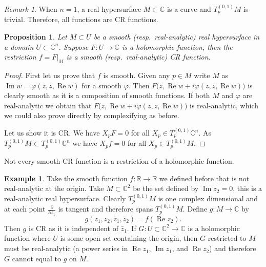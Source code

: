 \documentclass[12pt,openany]{book}
\renewcommand{\Re}{\operatorname{Re}}
\renewcommand{\Im}{\operatorname{Im}}
\newcommand{\C}{{\mathbb{C}}}
\newcommand{\R}{{\mathbb{R}}}
\theoremstyle{plain}
\newtheorem{prop}[thm]{Proposition}
\theoremstyle{remark}
\newtheorem{remark}[thm]{Remark}
\theoremstyle{definition}
\theoremstyle{exercise}
\theoremstyle{example}
\newtheorem{example}[thm]{Example}
\begin{document}
\begin{remark}
When $n=1$, a real hypersurface $M \subset \C$ is a curve and $T^{(0,1)}_p M$
is trivial.  Therefore, all functions are CR functions.
\end{remark}

\begin{prop}
Let $M \subset U$ be a smooth (resp.\ real-analytic) real hypersurface in a domain $U
\subset \C^n$.  Suppose $F \colon U \to \C$ is a holomorphic function,
then the restriction $f = F|_M$ is a smooth (resp.\ real-analytic) CR function.
\end{prop}

\begin{proof}
First let us prove that $f$ is smooth.  Given any $p \in M$ write $M$
as $\Im w = \varphi(z,\bar{z},\Re w)$ for a smooth $\varphi$.
Then $F\bigl(z,\Re w + i \varphi(z,\bar{z},\Re w) \bigr)$
is clearly smooth as it is a composition of smooth functions.
If both $M$ and $\varphi$ are real-analytic we obtain that 
$F\bigl(z,\Re w + i \varphi(z,\bar{z},\Re w) \bigr)$ is real-analytic, which
we could also prove directly by complexifying as before.

Let us show it is CR.
We have $X_p F = 0$
for all $X_p \in T_p^{(0,1)} \C^n$.
As $T_p^{(0,1)} M \subset T_p^{(0,1)} \C^n$ we have
$X_p f = 0$ for all $X_p \in T_p^{(0,1)} M$.
\end{proof}

Not every smooth CR function is a restriction of a holomorphic function.

\begin{example}
Take the smooth function $f \colon \R \to \R$ we defined before
that is not real-analytic at the origin.
Take $M \subset \C^2$ be the set defined by $\Im z_2 = 0$, this is a
real-analytic real hypersurface.  Clearly
$T_p^{(0,1)} M$ is one complex dimensional and at each point
$\frac{\partial}{\partial \bar{z}_1}$ is tangent and therefore spans
$T_p^{(0,1)} M$.  Define $g \colon M \to \C$ by
\begin{equation*}
g(z_1,z_2,\bar{z}_1,\bar{z}_2) = f(\Re z_2) .
\end{equation*}
Then $g$ is CR as it is independent of $\bar{z}_1$.
If $G \colon U \subset \C^2 \to \C$ is a holomorphic
function where $U$ is some open set containing the origin, then $G$
restricted to $M$ must be real-analytic (a power series in $\Re z_1$, $\Im
z_1$, and $\Re z_2$) and therefore $G$ cannot equal to 
$g$ on $M$.
\end{example}
\end{document}

